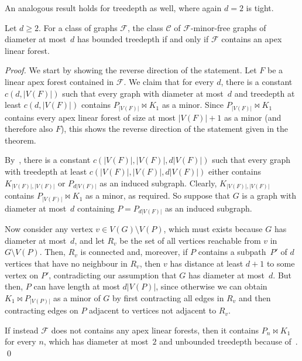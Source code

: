 \documentclass[runningheads,envcountsame]{llncs}
\newcommand{\forbiddenClass}{\mathcal{F}}
\newcommand{\join}{\bowtie}
\begin{document}
An analogous result holds for treedepth as well, where again $d=2$ is tight.

\begin{theorem}
\label{thm:td-minor}
Let $d\geq 2$.
For a class of graphs $\forbiddenClass$, the
   class $\mathcal{C}$ of $\forbiddenClass$-minor-free graphs of diameter at most~$d$ has bounded treedepth if and only if $\forbiddenClass$ contains an apex linear forest.
\end{theorem}
\begin{proof}
  We start by showing the reverse direction of the statement.
  Let $F$ be a linear apex forest contained in $\forbiddenClass$.
  We claim that for every $d$, there is a constant $c(d,|V(F)|)$ such that every graph
  with diameter at most~$d$ and treedepth at least $c(d,|V(F)|)$
  contains $P_{|V(F)|} \join K_1$ as a minor. Since $P_{|V(F)|}
  \join K_1$ contains every apex linear forest of size at most
  $|V(F)|+1$ as a minor (and therefore also $F$), this shows the reverse direction of the
  statement given in the theorem.
  
  By~, there is a constant $c(|V(F)|,|V(F)|,d|V(F)|)$
  such that every graph with treedepth at least $c(|V(F)|,|V(F)|,d|V(F)|)$ either
  contains $K_{|V(F)|,|V(F)|}$ or $P_{d|V(F)|}$ as an induced subgraph. Clearly,
  $K_{|V(F)|,|V(F)|}$ contains $P_{|V(F)|}\join K_1$ as a minor, as required.
  So suppose that $G$ is a graph with diameter at most~$d$ containing
  $P=P_{d|V(F)|}$ as an induced subgraph.
  
  Now consider any vertex $v \in V(G)\setminus V(P)$, which must exists
  because $G$ has diameter at most~$d$, and let $R_v$ be the
  set of all vertices reachable from $v$ in $G\setminus V(P)$. Then,
  $R_v$ is connected and, moreover, if $P$ contains a subpath~$P'$ of
  $d$ vertices that have no neighbour in $R_v$, then $v$ has
  distance at least $d+1$ to some vertex on $P'$, contradicting our
  assumption that $G$ has diameter at most~$d$. But then, $P$ can have
  length at most $d|V(P)|$, since otherwise 
  we can obtain $K_1 \join P_{|V(P)|}$ as a
  minor of $G$ by first contracting all edges in $R_v$ and then
  contracting edges on $P$ adjacent to vertices not adjacent to $R_v$.
  
  If instead $\forbiddenClass$ does not contains any apex linear forests, then it
  contains $P_n\join K_1$ for every $n$, which has diameter at most~$2$ and unbounded treedepth because of~. \qed
\end{proof}
\end{document}
